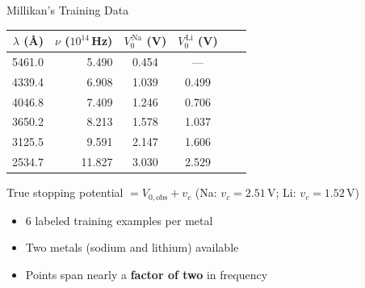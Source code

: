 \documentclass[aspectratio=169,12pt]{beamer}
\begin{document}
\begin{frame}[shrink=5]{Millikan's Training Data}

\begin{center}
\renewcommand{\arraystretch}{1.15}
\begin{tabular}{rrcccc}
\toprule
$\lambda$ (\AA) & $\nu$ ($10^{14}$\,Hz)
  & $V_0^{\,\mathrm{Na}}$ (V)
  & $V_0^{\,\mathrm{Li}}$ (V) \\
\midrule
5461.0 &  5.490 & 0.454  & ---   \\
4339.4 &  6.908 & 1.039  & 0.499 \\
4046.8 &  7.409 & 1.246  & 0.706 \\
3650.2 &  8.213 & 1.578  & 1.037 \\
3125.5 &  9.591 & 2.147  & 1.606 \\
2534.7 & 11.827 & 3.030  & 2.529 \\
\bottomrule
\end{tabular}
\end{center}

\medskip
True stopping potential $= V_{0,\text{obs}} + v_c$
\hspace{1em} (Na: $v_c = 2.51$\,V;\; Li: $v_c = 1.52$\,V)

\bigskip
\begin{itemize}
  \item 6 labeled training examples per metal
  \item Two metals (sodium and lithium) available
  \item Points span nearly a \textbf{factor of two} in frequency
\end{itemize}

\end{frame}
\end{document}
